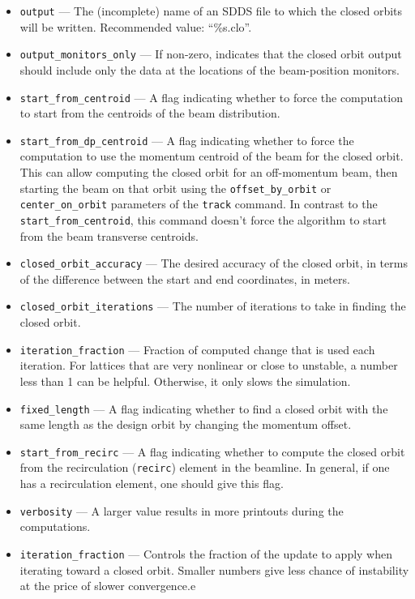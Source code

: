 \documentclass[11pt]{article}
\begin{document}
\begin{itemize}
\item \verb|output| --- The (incomplete) name of an SDDS file to which
the closed orbits will be written.  Recommended value: ``\%s.clo''.
\item \verb|output_monitors_only| --- If non-zero, indicates that the
closed orbit output should include only the data at the locations of
the beam-position monitors.
\item \verb|start_from_centroid| --- A flag indicating whether to
force the computation to start from the centroids of the beam
distribution.
\item \verb|start_from_dp_centroid| --- A flag indicating whether to 
force the computation to use the momentum centroid of the beam 
for the closed orbit.  This can allow computing the closed orbit
for an off-momentum beam, then starting the beam on that orbit
using the \verb|offset_by_orbit| or \verb|center_on_orbit| parameters
of the \verb|track| command.  In contrast to the \verb|start_from_centroid|,
this command doesn't force the algorithm to start from the beam
transverse centroids.
\item \verb|closed_orbit_accuracy| --- The desired accuracy of the
closed orbit, in terms of the difference between the start and end
coordinates, in meters.
\item \verb|closed_orbit_iterations| --- The number of iterations to
take in finding the closed orbit.
\item \verb|iteration_fraction| --- Fraction of computed change that
is used each iteration.  For lattices that are very nonlinear or close
to unstable, a number less than 1 can be helpful.  Otherwise, it only
slows the simulation.
\item \verb|fixed_length| --- A flag indicating whether to find a
closed orbit with the same length as the design orbit by changing the
momentum offset.
\item \verb|start_from_recirc| --- A flag indicating whether to
compute the closed orbit from the recirculation (\verb|recirc|)
element in the beamline.  In general, if one has a recirculation
element, one should give this flag.
\item \verb|verbosity| --- A larger value results in more printouts
during the computations.
\item \verb|iteration_fraction| --- Controls the fraction of the update to apply
  when iterating toward a closed orbit. Smaller numbers give less chance of instability
  at the price of slower convergence.e

\end{itemize}
\end{document}

